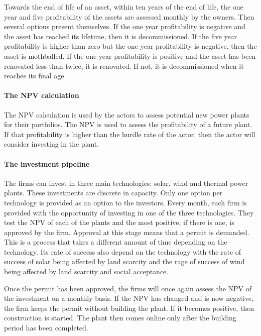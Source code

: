 Towards the end of life of an asset, within ten years of the end of life, the one year and five profitability of the assets are assessed monthly by the owners. Then several options present themselves. If the one year profitability is negative and the asset has reached its lifetime, then it is decommissioned. If the five year profitability is higher than zero but the one year profitability is negative, then the asset is mothballed. If the one year profitability is positive and the asset has been renovated less than twice, it is renovated. If not, it is decommissioned when it reaches its final age.

\paragraph{The NPV calculation}

The NPV calculation is used by the actors to assess potential new power plants for their portfolios. The NPV is used to assess the profitability of a future plant. If that profitability is higher than the hurdle rate of the actor, then the actor will consider investing in the plant.

\paragraph{The investment pipeline}

The firms can invest in three main technologies: solar, wind and thermal power plants. These investments are discrete in capacity. Only one option per technology is provided as an option to the investors. Every month, each firm is provided with the opportunity of investing in one of the three technologies. They test the NPV of each of the plants and the most positive, if there is one, is approved by the firm. Approval at this stage means that a permit is demanded. This is a process that takes a different amount of time depending on the technology. Its rate of success also depend on the technology with the rate of success of solar being affected by land scarcity and the rage of success of wind being affected by land scarcity and social acceptance.

Once the permit has been approved, the firms will once again assess the NPV of the investment on a monthly basis. If the NPV has changed and is now negative, the firm keeps the permit without building the plant. If it becomes positive, then construction is started. The plant then comes online only after the building period has been completed.

